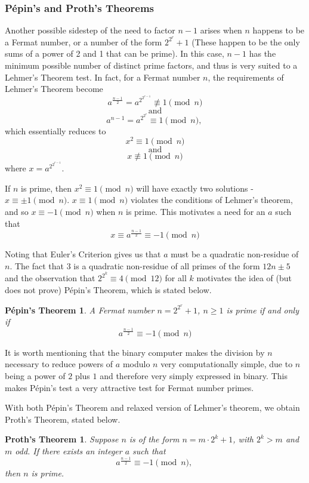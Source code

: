 \documentclass{article}
\begin{document}
\subsubsection*{P\'{e}pin's and Proth's Theorems}
Another possible sidestep of the need to factor $n-1$ arises when $n$ happens to be a Fermat number, or a number of the form $2^{2^r} + 1$ (These happen to be the only sums of a power of 2 and 1 that can be prime). In this case, $n - 1$ has the minimum possible number of distinct prime factors, and thus is very suited to a Lehmer's Theorem test. In fact, for a Fermat number $n$, the requirements of Lehmer's Theorem become
	$$a^{\frac{n - 1}{2}} = a^{2^{2^{r-1}}} \not\equiv 1 \pmod n $$
	$$\text{ and } $$
	$$a^{n - 1} = a^{2^{2^{r}}} \equiv 1 \pmod n \text{, }$$
which essentially reduces to 
	$$x^2 \equiv 1 \pmod n$$
	$$\text{ and }$$
	$$x \not \equiv 1 \pmod n$$
where $x = a^{2^{2^{r-1}}}$.

If $n$ is prime, then $x^2 \equiv 1 \pmod n$ will have exactly two solutions - $x \equiv \pm 1 \pmod n$. $x \equiv 1 \pmod n$ violates the conditions of Lehmer's theorem, and so $x \equiv -1 \pmod n$ when $n$ is prime. This motivates a need for an $a$ such that 
	$$x \equiv a^{\frac{n - 1}{2}} \equiv -1 \pmod n$$
	
\par Noting that Euler's Criterion gives us that $a$ must be a quadratic non-residue of $n$. The fact that $3$ is a quadratic non-residue of all primes of the form $12n \pm 5$ and the observation that $2^{2^k} \equiv 4 \pmod 12$ for all $k$ motivates the idea of (but does not prove) P\'{e}pin's Theorem, which is stated below.

\newtheorem*{pepin}{P\'{e}pin's Theorem}
\begin{pepin}
A Fermat number $n = 2^{2^r} + 1$, $n \geq 1$ is prime if and only if 
	$$ a^{\frac{n - 1}{2}} \equiv  - 1 \pmod n$$
\end{pepin}

It is worth mentioning that the binary computer makes the division by $n$ necessary to reduce powers of $a$ modulo $n$ very computationally simple, due to $n$ being a power of $2$ plus $1$ and therefore very simply expressed in binary. This makes P\'{e}pin's test a very attractive test for Fermat number primes. 

With both  P\'{e}pin's Theorem and relaxed version of Lehmer's theorem, we obtain Proth's Theorem, stated below.

\newtheorem*{proth}{Proth's Theorem}
\begin{proth}
Suppose $n$ is of the form $n = m \cdot 2^k + 1$, with $2^k > m$ and $m$ odd. If there exists an integer $a$ such that 
	$$a^{\frac{n-1}{2}} \equiv -1 \pmod n \text{, }$$
then $n$ is prime.
\end{proth}
\end{document}
